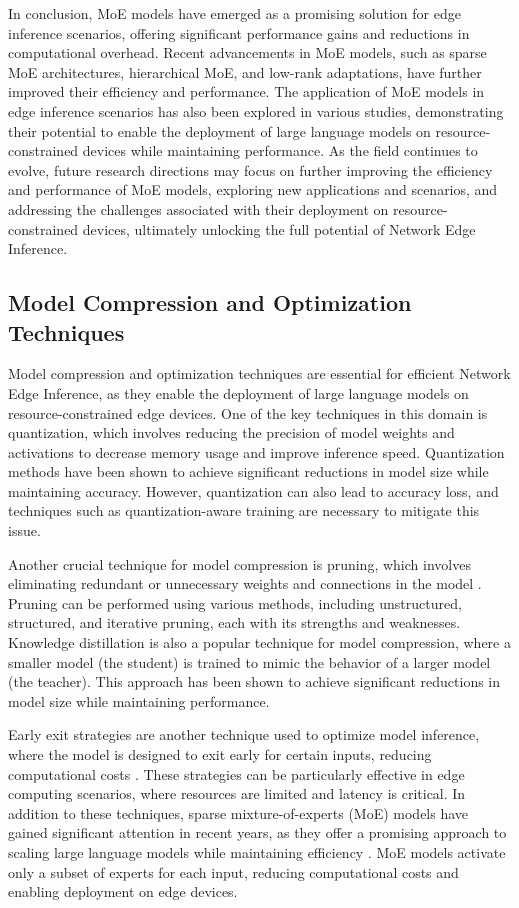 \documentclass[11pt,a4paper]{article}
\begin{document}
In conclusion, MoE models have emerged as a promising solution for edge inference scenarios, offering significant performance gains and reductions in computational overhead. Recent advancements in MoE models, such as sparse MoE architectures, hierarchical MoE, and low-rank adaptations, have further improved their efficiency and performance. The application of MoE models in edge inference scenarios has also been explored in various studies, demonstrating their potential to enable the deployment of large language models on resource-constrained devices while maintaining performance. As the field continues to evolve, future research directions may focus on further improving the efficiency and performance of MoE models, exploring new applications and scenarios, and addressing the challenges associated with their deployment on resource-constrained devices, ultimately unlocking the full potential of Network Edge Inference.


\subsection{Model Compression and Optimization Techniques}


Model compression and optimization techniques are essential for efficient Network Edge Inference, as they enable the deployment of large language models on resource-constrained edge devices. One of the key techniques in this domain is quantization, which involves reducing the precision of model weights and activations to decrease memory usage and improve inference speed. Quantization methods have been shown to achieve significant reductions in model size while maintaining accuracy. However, quantization can also lead to accuracy loss, and techniques such as quantization-aware training are necessary to mitigate this issue.

Another crucial technique for model compression is pruning, which involves eliminating redundant or unnecessary weights and connections in the model \cite{arxiv:2103.16716}. Pruning can be performed using various methods, including unstructured, structured, and iterative pruning, each with its strengths and weaknesses. Knowledge distillation is also a popular technique for model compression, where a smaller model (the student) is trained to mimic the behavior of a larger model (the teacher). This approach has been shown to achieve significant reductions in model size while maintaining performance.

Early exit strategies are another technique used to optimize model inference, where the model is designed to exit early for certain inputs, reducing computational costs \cite{arxiv:2202.07652}. These strategies can be particularly effective in edge computing scenarios, where resources are limited and latency is critical. In addition to these techniques, sparse mixture-of-experts (MoE) models have gained significant attention in recent years, as they offer a promising approach to scaling large language models while maintaining efficiency \cite{arxiv:2507.11181}. MoE models activate only a subset of experts for each input, reducing computational costs and enabling deployment on edge devices.
\end{document}
